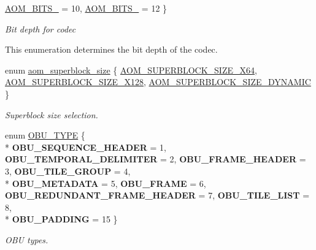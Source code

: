 \begin{DoxyCompactItemize}
\hyperlink{group__codec_gga6ed0e98eba4651c1ad845e39498e4153a91734384f432233c3d681052122ab8e7}{A\+O\+M\+\_\+\+B\+I\+T\+S\+\_} = 10, 
\hyperlink{group__codec_gga6ed0e98eba4651c1ad845e39498e4153a15836a87f9e9940885d5ef59a52bf728}{A\+O\+M\+\_\+\+B\+I\+T\+S\+\_} = 12
 \}\begin{DoxyCompactList}\small\item\em Bit depth for codec
\begin{DoxyItemize}
\item This enumeration determines the bit depth of the codec. 
\end{DoxyItemize}\end{DoxyCompactList}
\item 
enum \hyperlink{group__codec_gac34a24f7c6c0fef7518aed0da4425f61}{aom\+\_\+superblock\+\_\+size} \{ \hyperlink{group__codec_ggac34a24f7c6c0fef7518aed0da4425f61a5abd24080a18d4f7e33217d93a73e968}{A\+O\+M\+\_\+\+S\+U\+P\+E\+R\+B\+L\+O\+C\+K\+\_\+\+S\+I\+Z\+E\+\_\+X64}, 
\hyperlink{group__codec_ggac34a24f7c6c0fef7518aed0da4425f61a17127133dafcd42b1d792770981d67d0}{A\+O\+M\+\_\+\+S\+U\+P\+E\+R\+B\+L\+O\+C\+K\+\_\+\+S\+I\+Z\+E\+\_\+X128}, 
\hyperlink{group__codec_ggac34a24f7c6c0fef7518aed0da4425f61aaabb4d9ad771b2fa177ff6fb5437b179}{A\+O\+M\+\_\+\+S\+U\+P\+E\+R\+B\+L\+O\+C\+K\+\_\+\+S\+I\+Z\+E\+\_\+\+D\+Y\+N\+A\+M\+IC}
 \}\begin{DoxyCompactList}\small\item\em Superblock size selection. \end{DoxyCompactList}
\item 
enum \hyperlink{group__codec_ga8671b36010adf45694a1c0868333c5b6}{O\+B\+U\+\_\+\+T\+Y\+PE} \{ \\*
{\bfseries O\+B\+U\+\_\+\+S\+E\+Q\+U\+E\+N\+C\+E\+\_\+\+H\+E\+A\+D\+ER} = 1, 
{\bfseries O\+B\+U\+\_\+\+T\+E\+M\+P\+O\+R\+A\+L\+\_\+\+D\+E\+L\+I\+M\+I\+T\+ER} = 2, 
{\bfseries O\+B\+U\+\_\+\+F\+R\+A\+M\+E\+\_\+\+H\+E\+A\+D\+ER} = 3, 
{\bfseries O\+B\+U\+\_\+\+T\+I\+L\+E\+\_\+\+G\+R\+O\+UP} = 4, 
\\*
{\bfseries O\+B\+U\+\_\+\+M\+E\+T\+A\+D\+A\+TA} = 5, 
{\bfseries O\+B\+U\+\_\+\+F\+R\+A\+ME} = 6, 
{\bfseries O\+B\+U\+\_\+\+R\+E\+D\+U\+N\+D\+A\+N\+T\+\_\+\+F\+R\+A\+M\+E\+\_\+\+H\+E\+A\+D\+ER} = 7, 
{\bfseries O\+B\+U\+\_\+\+T\+I\+L\+E\+\_\+\+L\+I\+ST} = 8, 
\\*
{\bfseries O\+B\+U\+\_\+\+P\+A\+D\+D\+I\+NG} = 15
 \}\hypertarget{group__codec_ga8671b36010adf45694a1c0868333c5b6}{}\label{group__codec_ga8671b36010adf45694a1c0868333c5b6}
\begin{DoxyCompactList}\small\item\em O\+BU types. \end{DoxyCompactList}

\end{DoxyCompactItemize}
